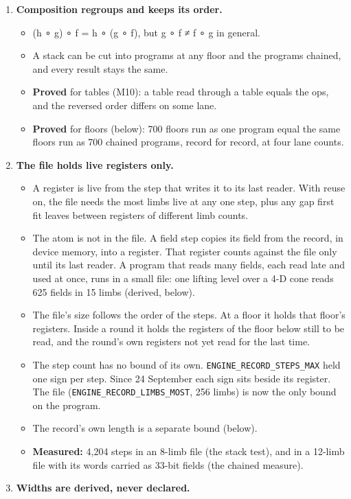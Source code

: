 \begin{enumerate}
\item \textbf{Composition regroups and keeps its order.}

\begin{itemize}
\item (h ∘ g) ∘ f = h ∘ (g ∘ f), but g ∘ f ≠ f ∘ g in general.
\item A stack can be cut into programs at any floor and the programs chained, and every result stays the same.
\item \textbf{Proved} for tables (M10): a table read through a table equals the ops, and the reversed order differs on some lane.
\item \textbf{Proved} for floors (below): 700 floors run as one program equal the same floors run as 700 chained programs, record for record, at four lane counts.
\end{itemize}
\item \textbf{The file holds live registers only.}

\begin{itemize}
\item A register is live from the step that writes it to its last reader. With reuse on, the file needs the most limbs live at any one step, plus any gap first fit leaves between registers of different limb counts.
\item The atom is not in the file. A field step copies its field from the record, in device memory, into a register. That register counts against the file only until its last reader. A program that reads many fields, each read late and used at once, runs in a small file: one lifting level over a 4-D cone reads 625 fields in 15 limbs (derived, below).
\item The file's size follows the order of the steps. At a floor it holds that floor's registers. Inside a round it holds the registers of the floor below still to be read, and the round's own registers not yet read for the last time.
\item The step count has no bound of its own. \texttt{ENGINE\_\allowbreak{}RECORD\_\allowbreak{}STEPS\_\allowbreak{}MAX} held one sign per step. Since 24 September each sign sits beside its register. The file (\texttt{ENGINE\_\allowbreak{}RECORD\_\allowbreak{}LIMBS\_\allowbreak{}MOST}, 256 limbs) is now the only bound on the program.
\item The record's own length is a separate bound (below).
\item \textbf{Measured:} 4,204 steps in an 8-limb file (the stack test), and in a 12-limb file with its words carried as 33-bit fields (the chained measure).
\end{itemize}
\item \textbf{Widths are derived, never declared.}


\end{enumerate}
